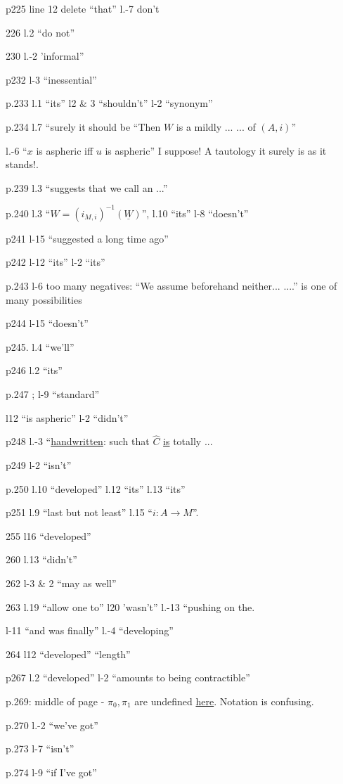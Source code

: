 
p225 line 12 delete ``that'' l.-7 don't

226 l.2 ``do not''

230 l.-2 'informal''

p232 l-3 ``inessential''

p.233 l.1 ``its'' l2 \& 3 ``shouldn't'' l-2 ``synonym''

p.234 l.7 ``surely it should be ``Then $W$ is a mildly ... ... of $(A,i)$''

 l.-6 ``$x$ is aspheric  iff $u$ is aspheric'' I suppose! A tautology it surely is as it stands!.

p.239 l.3 ``suggests that we call an ...''

p.240 l.3 ``$W=(i_{M,i})^{-1}(\underline{W})$'', l.10 ``its'' l-8 ``doesn't''

p241 l-15 ``suggested a long time ago''

p242 l-12 ``its'' l-2 ``its''

p.243 l-6 too many negatives: ``We assume beforehand neither... ....'' is one of many possibilities

p244 l-15 ``doesn't''

p245. l.4 ``we'll''

p246 l.2 ``its''

p.247    ; l-9 ``standard''

l12 ``is aspheric'' l-2 ``didn't''

p248 l.-3 ``\uline{handwritten}: such that $\widehat C$ \uline{is} totally ...

p249 l-2 ``isn't''

p.250 l.10 ``developed'' l.12 ``its'' l.13 ``its''

p251 l.9 ``last but not least'' l.15 ``$i\colon A\to M$''.

 255 l16 ``developed''

260 l.13 ``didn't''

262  l-3 \& \unsure{-}2 ``may as well''

263 l.19 ``allow one to'' l20 'wasn't'' l.-13 ``pushing on the.

l-11 ``and was finally'' l.-4 ``developing''

264 l12 ``developed'' ``length''

p267 l.2 ``developed'' l-2 ``amounts to  being contractible''

p.269: middle of page -   $\pi_0,\pi_1$ are undefined \uline{here}. Notation is confusing.

p.270 l.-2 ``we've got''

p.273 l-7 ``isn't''

p.274 l-9 ``if I've got''

